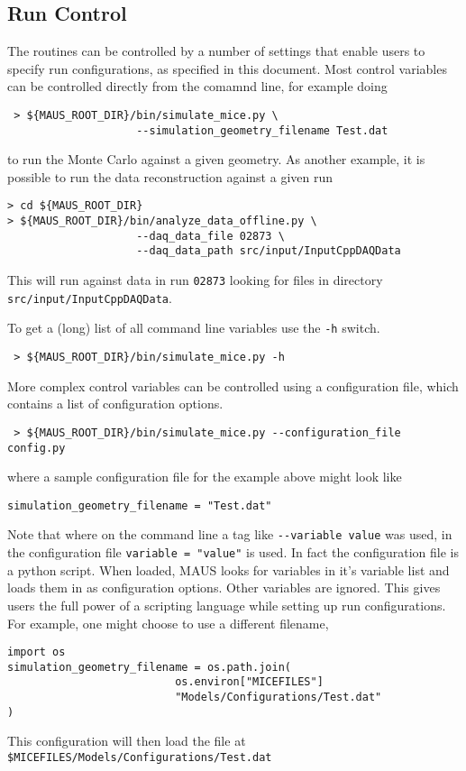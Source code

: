 \subsection{Run Control}
The routines can be controlled by a number of settings that enable users to specify run configurations, as specified in this document. Most control variables can be controlled directly from the comamnd line, for example doing
\begin{verbatim}
 > ${MAUS_ROOT_DIR}/bin/simulate_mice.py \
                    --simulation_geometry_filename Test.dat
\end{verbatim}
to run the Monte Carlo against a given geometry. As another example, it is possible to run the data reconstruction against a given run
\begin{verbatim}
> cd ${MAUS_ROOT_DIR} 
> ${MAUS_ROOT_DIR}/bin/analyze_data_offline.py \
                    --daq_data_file 02873 \
                    --daq_data_path src/input/InputCppDAQData
\end{verbatim}
This will run against data in run \verb|02873| looking for files in directory \verb|src/input/InputCppDAQData|.

To get a (long) list of all command line variables use the \verb|-h| switch.
\begin{verbatim}
 > ${MAUS_ROOT_DIR}/bin/simulate_mice.py -h
\end{verbatim}

More complex control variables can be controlled using a configuration file, which contains a list of configuration options.
\begin{verbatim}
 > ${MAUS_ROOT_DIR}/bin/simulate_mice.py --configuration_file config.py
\end{verbatim}
where a sample configuration file for the example above might look like
\begin{verbatim}
simulation_geometry_filename = "Test.dat"
\end{verbatim}
Note that where on the command line a tag like \verb|--variable value| was used, in the configuration file \verb|variable = "value"| is used. In fact the configuration file is a python script. When loaded, MAUS looks for variables in it's variable list and loads them in as configuration options. Other variables are ignored. This gives users the full power of a scripting language while setting up run configurations. For example, one might choose to use a different filename,
\begin{verbatim}
import os
simulation_geometry_filename = os.path.join(
                          os.environ["MICEFILES"]
                          "Models/Configurations/Test.dat"
)
\end{verbatim}
This configuration will then load the file at \verb|$MICEFILES/Models/Configurations/Test.dat|

